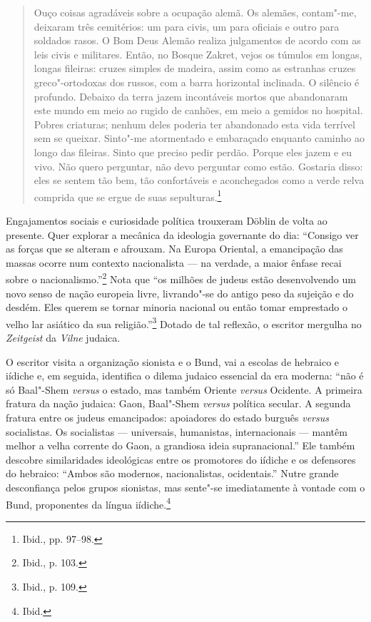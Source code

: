 \begin{quote}
Ouço coisas agradáveis sobre a ocupação alemã. Os alemães, contam"-me,
deixaram três cemitérios: um para civis, um para oficiais e outro para
soldados rasos. O Bom Deus Alemão realiza julgamentos de acordo com as
leis civis e militares. Então, no Bosque Zakret, vejos os túmulos em
longas, longas fileiras: cruzes simples de madeira, assim como as
estranhas cruzes greco"-ortodoxas dos russos, com a barra horizontal
inclinada. O silêncio é profundo. Debaixo da terra jazem incontáveis
mortos que abandonaram este mundo em meio ao rugido de canhões, em meio
a gemidos no hospital. Pobres criaturas; nenhum deles poderia ter
abandonado esta vida terrível sem se queixar. Sinto"-me atormentado e
embaraçado enquanto caminho ao longo das fileiras. Sinto que preciso
pedir perdão. Porque eles jazem e eu vivo. Não quero perguntar, não devo
perguntar como estão. Gostaria disso: eles se sentem tão bem, tão
confortáveis e aconchegados como a verde relva comprida que se ergue de
suas sepulturas.\footnote{Ibid., pp. 97--98.}
\end{quote}

Engajamentos sociais e curiosidade política trouxeram Döblin de volta ao
presente. Quer explorar a mecânica da ideologia governante do dia:
``Consigo ver as forças que se alteram e afrouxam. Na Europa Oriental, a
emancipação das massas ocorre num contexto nacionalista --- na verdade, a
maior ênfase recai sobre o nacionalismo.''\footnote{Ibid., p. 103.} Nota
que ``os milhões de judeus estão desenvolvendo um novo senso de nação
europeia livre, livrando"-se do antigo peso da sujeição e do desdém. Eles
querem se tornar minoria nacional ou então tomar emprestado o velho lar
asiático da sua religião.''\footnote{Ibid., p. 109.} Dotado de tal
reflexão, o escritor mergulha no \textit{Zeitgeist} da \textit{Vilne} judaica.

O escritor visita a organização sionista e o Bund, vai a escolas de
hebraico e iídiche e, em seguida, identifica o dilema judaico essencial
da era moderna: ``não é só Baal"-Shem \textit{versus} o estado, mas também
Oriente \textit{versus} Ocidente. A primeira fratura da nação judaica:
Gaon, Baal"-Shem \textit{versus} política secular. A segunda fratura entre
os judeus emancipados: apoiadores do estado burguês \textit{versus}
socialistas. Os socialistas --- universais, humanistas, internacionais ---
mantêm melhor a velha corrente do Gaon, a grandiosa ideia
supranacional.'' Ele também descobre similaridades ideológicas entre os
promotores do iídiche e os defensores do hebraico: ``Ambos são modernos,
nacionalistas, ocidentais.'' Nutre grande desconfiança pelos grupos
sionistas, mas sente"-se imediatamente à vontade com o Bund, proponentes
da língua iídiche.\footnote{Ibid.}


